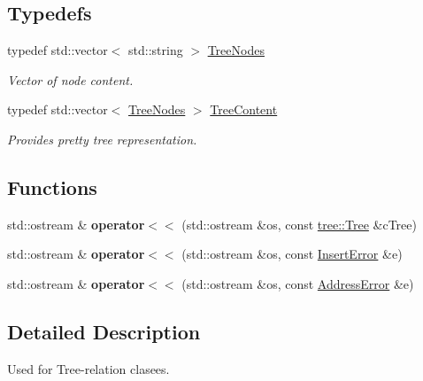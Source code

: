 \subsection*{Typedefs}
\begin{DoxyCompactItemize}
\item 
\hypertarget{namespacetree_a36da3b38ad98fe87c16c4336cd5b8a44}{typedef std\-::vector$<$ std\-::string $>$ \hyperlink{namespacetree_a36da3b38ad98fe87c16c4336cd5b8a44}{Tree\-Nodes}}\label{namespacetree_a36da3b38ad98fe87c16c4336cd5b8a44}

\begin{DoxyCompactList}\small\item\em Vector of node content. \end{DoxyCompactList}\item 
\hypertarget{namespacetree_a1906ab31086935949f162ea3e2c41200}{typedef std\-::vector$<$ \hyperlink{namespacetree_a36da3b38ad98fe87c16c4336cd5b8a44}{Tree\-Nodes} $>$ \hyperlink{namespacetree_a1906ab31086935949f162ea3e2c41200}{Tree\-Content}}\label{namespacetree_a1906ab31086935949f162ea3e2c41200}

\begin{DoxyCompactList}\small\item\em Provides pretty tree representation. \end{DoxyCompactList}\end{DoxyCompactItemize}
\subsection*{Functions}
\begin{DoxyCompactItemize}
\item 
\hypertarget{namespacetree_a866148b74626a75c48e2b1228e2e455c}{std\-::ostream \& {\bfseries operator$<$$<$} (std\-::ostream \&os, const \hyperlink{classtree_1_1Tree}{tree\-::\-Tree} \&c\-Tree)}\label{namespacetree_a866148b74626a75c48e2b1228e2e455c}

\item 
\hypertarget{namespacetree_a674f9624f1c01eabd2eb8177740ca377}{std\-::ostream \& {\bfseries operator$<$$<$} (std\-::ostream \&os, const \hyperlink{classtree_1_1InsertError}{Insert\-Error} \&e)}\label{namespacetree_a674f9624f1c01eabd2eb8177740ca377}

\item 
\hypertarget{namespacetree_a3dec862cb2578d085095490c9a2dfee9}{std\-::ostream \& {\bfseries operator$<$$<$} (std\-::ostream \&os, const \hyperlink{classtree_1_1AddressError}{Address\-Error} \&e)}\label{namespacetree_a3dec862cb2578d085095490c9a2dfee9}

\end{DoxyCompactItemize}


\subsection{Detailed Description}
Used for Tree-\/relation clasees. 